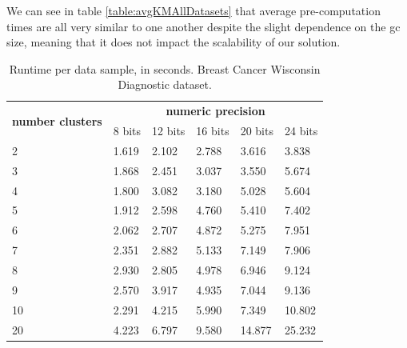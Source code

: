 We can see in table \ref{table:avgKMAllDatasets} that average pre-computation times are all very similar to one another despite the slight dependence on the \ac{gc} size, meaning that it does not impact the scalability of our solution.

\begin{table}[H]
\centering
\caption{Runtime per data sample, in seconds. Breast Cancer Wisconsin Diagnostic dataset.}
\label{table:runtimeKMBCW}
\begin{tabular}{|l|l|l|l|l|l|}
\hline
\multirow{2}{*}{\textbf{number clusters}} & \multicolumn{5}{c|}{\textbf{numeric precision}}                                             \\ \cline{2-6} 
                                          & 8 bits & 12 bits & 16 bits & 20 bits & 24 bits \\ \hline
2                                & 1.619           & 2.102            & 2.788            & 3.616            & 3.838            \\ \hline
3                                & 1.868           & 2.451            & 3.037            & 3.550            & 5.674            \\ \hline
4                                & 1.800           & 3.082            & 3.180            & 5.028            & 5.604            \\ \hline
5                                & 1.912           & 2.598            & 4.760            & 5.410            & 7.402            \\ \hline
6                                & 2.062           & 2.707            & 4.872            & 5.275            & 7.951            \\ \hline
7                                & 2.351           & 2.882            & 5.133            & 7.149            & 7.906            \\ \hline
8                                & 2.930           & 2.805            & 4.978            & 6.946            & 9.124            \\ \hline
9                                & 2.570           & 3.917            & 4.935            & 7.044            & 9.136            \\ \hline
10                               & 2.291           & 4.215            & 5.990            & 7.349            & 10.802           \\ \hline
20                               & 4.223           & 6.797            & 9.580            & 14.877           & 25.232           \\ \hline

\end{tabular}
\end{table}
